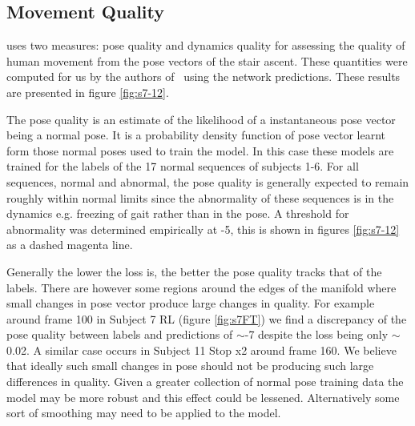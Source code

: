 \documentclass[11pt]{article} %
\begin{document}
\subsection{Movement Quality}

\cite{Paiement} uses two measures: pose quality and dynamics quality for assessing the quality of human movement from the pose vectors of the stair ascent. These quantities were computed for us by the authors of~\cite{Paiement} using the network predictions. These results are presented in figure \ref{fig:s7-12}. 

The pose quality is an estimate of the likelihood of a instantaneous pose vector being a normal pose. It is a probability density function of pose vector learnt form those normal poses used to train the model. In this case these models are trained for the labels of the 17 normal sequences of subjects 1-6. For all sequences, normal and abnormal, the pose quality is generally expected to remain roughly within normal limits since the abnormality of these sequences is in the dynamics e.g. freezing of gait rather than in the pose. A threshold for abnormality was determined empirically at -5, this is shown in figures \ref{fig:s7-12} as a dashed magenta line.

Generally the lower the loss is, the better the pose quality tracks that of the labels. There are however some regions around the edges of the manifold where small changes in pose vector produce large changes in quality. For example around frame 100 in Subject 7 RL (figure \ref{fig:s7FT}) we find a discrepancy of the pose quality between labels and predictions of $\sim$-7 despite the loss being only $\sim$0.02. A similar case occurs in Subject 11 Stop x2 around frame 160. We believe that ideally such small changes in pose should not be producing such large differences in quality. Given a greater collection of normal pose training data the model may be more robust and this effect could be lessened. Alternatively some sort of smoothing may need to be applied to the model. 
\end{document}
